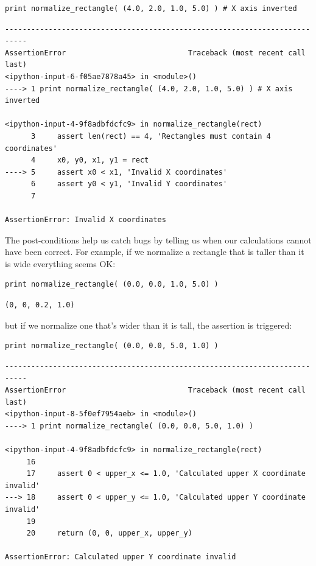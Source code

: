 \documentclass{book}
\begin{document}
\begin{verbatim}
print normalize_rectangle( (4.0, 2.0, 1.0, 5.0) ) # X axis inverted
\end{verbatim}

\begin{verbatim}
---------------------------------------------------------------------------
AssertionError                            Traceback (most recent call last)
<ipython-input-6-f05ae7878a45> in <module>()
----> 1 print normalize_rectangle( (4.0, 2.0, 1.0, 5.0) ) # X axis inverted

<ipython-input-4-9f8adbfdcfc9> in normalize_rectangle(rect)
      3     assert len(rect) == 4, 'Rectangles must contain 4 coordinates'
      4     x0, y0, x1, y1 = rect
----> 5     assert x0 < x1, 'Invalid X coordinates'
      6     assert y0 < y1, 'Invalid Y coordinates'
      7

AssertionError: Invalid X coordinates
\end{verbatim}

The post-conditions help us catch bugs by telling us when our
calculations cannot have been correct. For example, if we normalize a
rectangle that is taller than it is wide everything seems OK:

\begin{verbatim}
print normalize_rectangle( (0.0, 0.0, 1.0, 5.0) )
\end{verbatim}

\begin{verbatim}
(0, 0, 0.2, 1.0)
\end{verbatim}

but if we normalize one that's wider than it is tall, the assertion is
triggered:

\begin{verbatim}
print normalize_rectangle( (0.0, 0.0, 5.0, 1.0) )
\end{verbatim}

\begin{verbatim}
---------------------------------------------------------------------------
AssertionError                            Traceback (most recent call last)
<ipython-input-8-5f0ef7954aeb> in <module>()
----> 1 print normalize_rectangle( (0.0, 0.0, 5.0, 1.0) )

<ipython-input-4-9f8adbfdcfc9> in normalize_rectangle(rect)
     16
     17     assert 0 < upper_x <= 1.0, 'Calculated upper X coordinate invalid'
---> 18     assert 0 < upper_y <= 1.0, 'Calculated upper Y coordinate invalid'
     19
     20     return (0, 0, upper_x, upper_y)

AssertionError: Calculated upper Y coordinate invalid
\end{verbatim}
\end{document}
